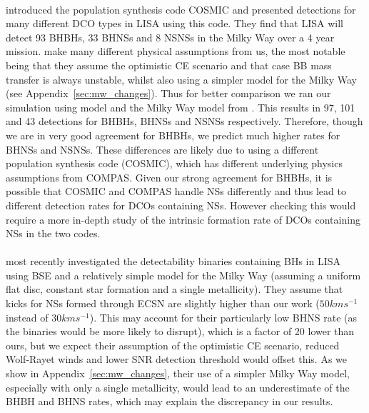 \paragraph{\citet{Breivik+2020}} introduced the population synthesis code COSMIC and presented detections for many different DCO types in LISA using this code. They find that LISA will detect 93 BHBHs, 33 BHNSs and 8 NSNSs in the Milky Way over a 4 year mission. \citet{Breivik+2020} make many different physical assumptions from us, the most notable being that they assume the optimistic CE scenario and that case BB mass transfer is always unstable, whilst also using a simpler model for the Milky Way (see Appendix~\ref{sec:mw_changes}). Thus for better comparison we ran our simulation using model \modCaseBBOpt{} and the Milky Way model from \citet{Breivik+2020}. This results in 97, 101 and 43 detections for BHBHs, BHNSs and NSNSs respectively. Therefore, though we are in very good agreement for BHBHs, we predict much higher rates for BHNSs and NSNSs. These differences are likely due to using a different population synthesis code (COSMIC), which has different underlying physics assumptions from COMPAS. Given our strong agreement for BHBHs, it is possible that COSMIC and COMPAS handle NSs differently and thus lead to different detection rates for DCOs containing NSs. However checking this would require a more in-depth study of the intrinsic formation rate of DCOs containing NSs in the two codes.

\paragraph{\citet{Shao+2021}} most recently investigated the detectability binaries containing BHs in LISA using BSE and a relatively simple model for the Milky Way (assuming a uniform flat disc, constant star formation and a single metallicity). They assume that kicks for NSs formed through ECSN are slightly higher than our work ($50 \unit{km}{s^{-1}}$ instead of $30 \unit{km}{s^{-1}}$). This may account for their particularly low BHNS rate (as the binaries would be more likely to disrupt), which is a factor of 20 lower than ours, but we expect their assumption of the optimistic CE scenario, reduced Wolf-Rayet winds and lower SNR detection threshold would offset this. As we show in Appendix~\ref{sec:mw_changes}, their use of a simpler Milky Way model, especially with only a single metallicity, would lead to an underestimate of the BHBH and BHNS rates, which may explain the discrepancy in our results.